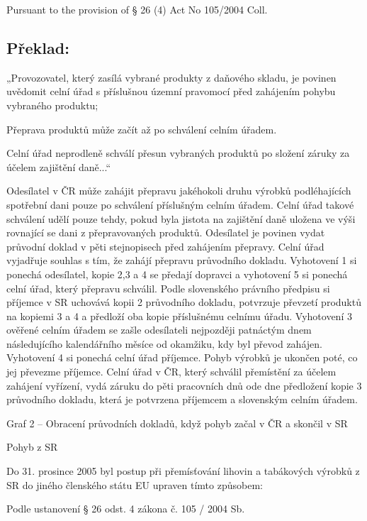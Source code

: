\documentclass[10pt]{article}
\begin{document}
Pursuant to the provision of § 26 (4) Act No 105/2004 Coll.


\pagebreak

\subsection*{Překlad:}



„Provozovatel, který zasílá vybrané produkty z daňového skladu, je povinen uvědomit celní úřad s příslušnou územní pravomocí před zahájením pohybu vybraného produktu;

Přeprava produktů může začít až po schválení celním úřadem.


Celní úřad neprodleně schválí přesun vybraných produktů po složení záruky za účelem zajištění daně...“

Odesílatel v ČR může zahájit přepravu jakéhokoli druhu výrobků podléhajících spotřební dani pouze po schválení příslušným celním úřadem.
Celní úřad takové schválení udělí pouze tehdy, pokud byla jistota na zajištění daně uložena ve výši rovnající se dani z přepravovaných produktů.
Odesílatel je povinen vydat průvodní doklad v pěti stejnopisech před zahájením přepravy.
Celní úřad vyjadřuje souhlas s tím, že zahájí přepravu průvodního dokladu.
Vyhotovení 1 si ponechá odesílatel, kopie 2,3 a 4 se předají dopravci a vyhotovení 5 si ponechá celní úřad, který přepravu schválil.
Podle slovenského právního předpisu si příjemce v SR uchovává kopii 2 průvodního dokladu, potvrzuje převzetí produktů na kopiemi 3 a 4 a předloží oba kopie příslušnému celnímu úřadu.
Vyhotovení 3 ověřené celním úřadem se zašle odesílateli nejpozději patnáctým dnem následujícího kalendářního měsíce od okamžiku, kdy byl převod zahájen.
Vyhotovení 4 si ponechá celní úřad příjemce.
Pohyb výrobků je ukončen poté, co jej převezme příjemce.
Celní úřad v ČR, který schválil přemístění za účelem zahájení vyřízení, vydá záruku do pěti pracovních dnů ode dne předložení kopie 3 průvodního dokladu, která je potvrzena příjemcem a slovenským celním úřadem.


Graf 2 – Obracení průvodních dokladů, když pohyb začal v ČR a skončil v SR



Pohyb z SR



Do 31. prosince 2005 byl postup při přemísťování lihovin a tabákových výrobků z SR do jiného členského státu EU upraven tímto způsobem:

Podle ustanovení § 26 odst. 4 zákona č. 105 / 2004 Sb.
\end{document}
